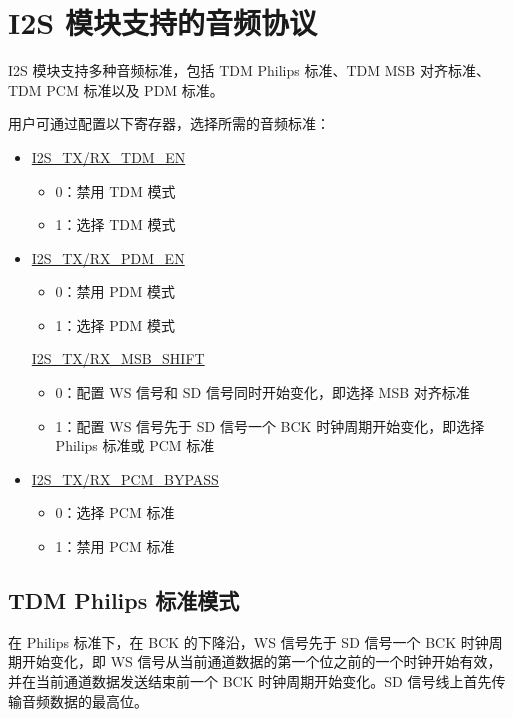 \documentclass[main\_\_CN.tex]{subfiles}
\begin{document}
\section{I2S 模块支持的音频协议} \label{I2S_supported_protocal}

\chipname{} I2S 模块支持多种音频标准，包括 TDM Philips 标准、TDM MSB 对齐标准、TDM PCM 标准以及 PDM 标准。

用户可通过配置以下寄存器，选择所需的音频标准：
\begin{itemize}
    \item \hyperref[fielddesc:I2SRXMSBSHIFT]{I2S\_TX/RX\_TDM\_EN}
    \begin{itemize}
        \item 0：禁用 TDM 模式
        \item 1：选择 TDM 模式
    \end{itemize}
    \item \hyperref[fielddesc:I2SRXMSBSHIFT]{I2S\_TX/RX\_PDM\_EN}
    \begin{itemize}
        \item 0：禁用 PDM 模式
        \item 1：选择 PDM 模式
    \end{itemize}
    \hyperref[fielddesc:I2SRXMSBSHIFT]{I2S\_TX/RX\_MSB\_SHIFT}
    \begin{itemize}
        \item 0：配置 WS 信号和 SD 信号同时开始变化，即选择 MSB 对齐标准
        \item 1：配置 WS 信号先于 SD 信号一个 BCK 时钟周期开始变化，即选择 Philips 标准或 PCM 标准
    \end{itemize}
    \item \hyperref[fielddesc:I2SRXPCMBYPASS]{I2S\_TX/RX\_PCM\_BYPASS}
    \begin{itemize}
        \item 0：选择 PCM 标准
        \item 1：禁用 PCM 标准
    \end{itemize}
\end{itemize}

\subsection{TDM Philips 标准模式}

在 Philips 标准下，在 BCK 的下降沿，WS 信号先于 SD 信号一个 BCK 时钟周期开始变化，即 WS 信号从当前通道数据的第一个位之前的一个时钟开始有效，并在当前通道数据发送结束前一个 BCK 时钟周期开始变化。SD 信号线上首先传输音频数据的最高位。
\end{document}
